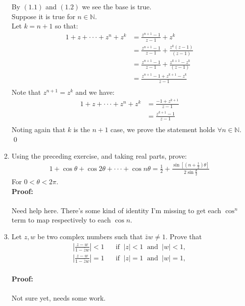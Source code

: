 \begin{enumerate}
	By $(1.1)$ and $(1.2)$ we see the base is true. \\

	Suppose it is true for $n \in \mathbb{N}.$ \\

	Let $k = n + 1$ so that:
	\begin{align*}
		1 + z + \cdot\cdot\cdot + z^n + z^k &= \frac{z^{n + 1} - 1}{z - 1} + z^k \\
		&= \frac{z^{n + 1} - 1}{z - 1} + \frac{z^k(z - 1)}{(z - 1)} \\
		&= \frac{z^{n + 1} - 1}{z - 1} + \frac{z^{k + 1} - z^k}{(z - 1)} \\
		&= \frac{z^{n + 1} - 1 + z^{k + 1} - z^k}{z - 1} \\ 
	\end{align*}
	Note that $z^{n + 1} = z^k$ and we have:
	\begin{align*}
		1 + z + \cdot\cdot\cdot + z^n + z^k &= \frac{ - 1 + z^{k + 1}}{z - 1} \\
		&= \frac{z^{k + 1} - 1}{z - 1} \\
	\end{align*}
	Noting again that $k$ is the $n + 1$ case, we prove the statement holds $\forall n \in \mathbb{N}.$
	\qed 


	\item Using the preceding exercise, and taking real parts, prove:
	\begin{align*}
		1 + \cos\theta + \cos2\theta + \cdot\cdot\cdot + \cos n\theta = \frac{1}{2} + \frac{\sin[(n + \frac{1}{2})\theta]}{2\sin{\frac{\theta}{2}}}
	\end{align*}
	For $0 < \theta < 2\pi.$ \\

	\textbf{Proof:} \\
	\\
	Need help here. There's some kind of identity I'm missing to get each $\cos^n$ term to map respectively to each $\cos n.$

	\item Let $z, w$ be two complex numbers such that $\bar{z}w \neq 1.$ Prove that
	\begin{align*}
		\left| \frac{z - w}{1 - \bar{z}w} \right| < 1 \;\;\;\;\;\; \text{if} \;\; |z| < 1 \;\; \text{and} \;\; |w| < 1, \\
		\left| \frac{z - w}{1 - \bar{z}w} \right| = 1 \;\;\;\;\;\; \text{if} \;\; |z| = 1 \;\; \text{and} \;\; |w| = 1, \\
	\end{align*}
	
	\textbf{Proof:} \\
	\\
	Not sure yet, needs some work.

\end{enumerate}

